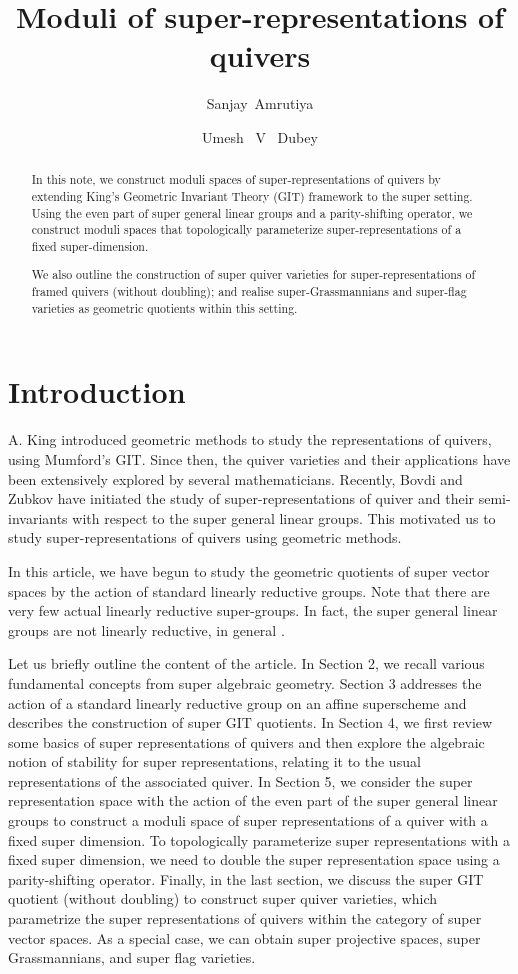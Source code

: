 \documentclass[12pt, reqno]{amsart}
\title{Moduli of super-representations of quivers}
\author{Sanjay~Amrutiya}
\author{Umesh ~V ~Dubey}
\date{}
\theoremstyle{plain}
\numberwithin{equation}{section}
\begin{document}
\maketitle
\begin{abstract}
 In this note, we construct moduli spaces of super-representations of quivers by extending King’s Geometric Invariant Theory (GIT) framework to the super setting. 
 Using the even part of super general linear groups and a parity-shifting operator, we construct moduli spaces that topologically parameterize super-representations of a fixed super-dimension. 

 We also outline the construction of super quiver varieties for super-representations of framed quivers (without doubling); and realise super-Grassmannians and super-flag varieties as geometric quotients within this setting.
\end{abstract}
%
\section{Introduction}
A. King \cite{Ki94} introduced geometric methods to study the 
representations of quivers, using Mumford's GIT. Since then, 
the quiver varieties and their applications have been extensively 
explored by several mathematicians. Recently, Bovdi and Zubkov
\cite{BZ20} have initiated the study of super-representations 
of quiver and their semi-invariants with respect to the super 
general linear groups. This motivated us to study super-representations of quivers using geometric methods.

In this article, we have begun to study the geometric 
quotients of super vector spaces by the action of standard 
linearly reductive groups. Note that there are very few  
actual linearly reductive super-groups. In fact, the super 
general linear groups are not linearly reductive, in 
general \cite{S21}. 

Let us briefly outline the content of the article. In Section 2, we recall various fundamental concepts from super algebraic geometry. Section 3 addresses the action of a standard linearly reductive group on an affine superscheme and describes the construction of super GIT quotients. In Section 4, we first review some basics of super representations of quivers and then explore the algebraic notion of stability for super representations, relating it to the usual representations of the associated quiver. In Section 5, we consider the super representation space with the action of the even part of the super general linear groups to construct a moduli space of super representations of a quiver with a fixed super dimension. To topologically parameterize super representations with a fixed super dimension, we need to double the super representation space using a parity-shifting operator. Finally, in the last section, we discuss the super GIT quotient (without doubling) to construct super quiver varieties, which parametrize the super representations of quivers within the category of super vector spaces. As a special case, we can obtain super projective spaces, super Grassmannians, and super flag varieties.
\end{document}
